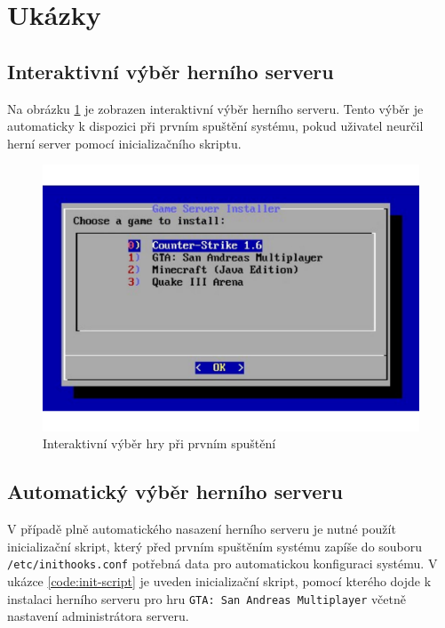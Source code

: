 \section{Ukázky}

\subsection{Interaktivní výběr herního serveru}

Na obrázku \ref{fig:game-selection} je zobrazen interaktivní výběr herního serveru. Tento výběr je automaticky
k dispozici při prvním spuštění systému, pokud uživatel neurčil herní server pomocí inicializačního skriptu.

\begin{figure}[h]
    \centering
    \includegraphics[width=1\linewidth]{chapters/images/game-selection.pdf}
    \caption{Interaktivní výběr hry při prvním spuštění}
    \label{fig:game-selection}
\end{figure}

\subsection{Automatický výběr herního serveru}

V případě plně automatického nasazení herního serveru je nutné použít inicializační skript, který před prvním spuštěním systému
zapíše do souboru \texttt{/etc/inithooks.conf} potřebná data pro automatickou konfiguraci systému.
V ukázce \ref{code:init-script} je uveden inicializační skript, pomocí kterého dojde k instalaci herního serveru pro hru \texttt{GTA: San Andreas Multiplayer}
včetně nastavení administrátora serveru.


